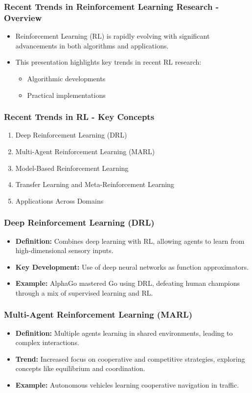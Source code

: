 \documentclass[aspectratio=169]{beamer}
\begin{document}
\begin{frame}[fragile]
    \frametitle{Recent Trends in Reinforcement Learning Research - Overview}
    \begin{itemize}
        \item Reinforcement Learning (RL) is rapidly evolving with significant advancements in both algorithms and applications.
        \item This presentation highlights key trends in recent RL research:
            \begin{itemize}
                \item Algorithmic developments
                \item Practical implementations
            \end{itemize}
    \end{itemize}
\end{frame}

\begin{frame}[fragile]
    \frametitle{Recent Trends in RL - Key Concepts}
    \begin{enumerate}
        \item Deep Reinforcement Learning (DRL)
        \item Multi-Agent Reinforcement Learning (MARL)
        \item Model-Based Reinforcement Learning
        \item Transfer Learning and Meta-Reinforcement Learning
        \item Applications Across Domains
    \end{enumerate}
\end{frame}

\begin{frame}[fragile]
    \frametitle{Deep Reinforcement Learning (DRL)}
    \begin{itemize}
        \item \textbf{Definition:} Combines deep learning with RL, allowing agents to learn from high-dimensional sensory inputs.
        \item \textbf{Key Development:} Use of deep neural networks as function approximators.
        \item \textbf{Example:} AlphaGo mastered Go using DRL, defeating human champions through a mix of supervised learning and RL.
    \end{itemize}
\end{frame}

\begin{frame}[fragile]
    \frametitle{Multi-Agent Reinforcement Learning (MARL)}
    \begin{itemize}
        \item \textbf{Definition:} Multiple agents learning in shared environments, leading to complex interactions.
        \item \textbf{Trend:} Increased focus on cooperative and competitive strategies, exploring concepts like equilibrium and coordination.
        \item \textbf{Example:} Autonomous vehicles learning cooperative navigation in traffic.
    \end{itemize}
\end{frame}
\end{document}
